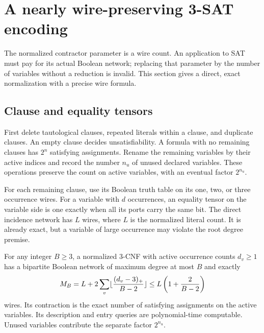 \section{A nearly wire-preserving 3-SAT encoding}\label{sec:normalization}

The normalized contractor parameter is a wire count. An application to
SAT must pay for its actual Boolean network; replacing that parameter by
the number of variables without a reduction is invalid. This section
gives a direct, exact normalization with a precise wire formula.

\subsection{Clause and equality tensors}

First delete tautological clauses, repeated literals within a clause,
and duplicate clauses. An empty clause decides unsatisfiability. A formula
with no remaining clauses has $2^n$ satisfying assignments. Rename the
remaining variables by their active indices and record the number $n_u$
of unused declared variables. These operations preserve the count on
active variables, with an eventual factor $2^{n_u}$.

For each remaining clause, use its Boolean truth table on its one, two,
or three occurrence wires. For a variable with $d$ occurrences, an
equality tensor on the variable side is one exactly when all its ports
carry the same bit. The direct incidence network has $L$ wires, where
$L$ is the normalized literal count. It is already exact, but a variable
of large occurrence may violate the root degree premise.

\begin{theorem}\label{thm:equality}
For any integer $B\ge3$, a normalized 3-CNF with active occurrence
counts $d_v\ge1$ has a bipartite Boolean network of maximum degree
at most $B$ and exactly
\begin{equation}\label{eq:wires}
 M_B=L+2\sum_v\lfloor\frac{(d_v-3)_+}{B-2}\rfloor
 \le L\left(1+\frac2{B-2}\right)
\end{equation}
wires. Its contraction is the exact number of satisfying assignments
on the active variables. Its description and entry queries are
polynomial-time computable. Unused variables contribute the separate
factor $2^{n_u}$.
\end{theorem}

